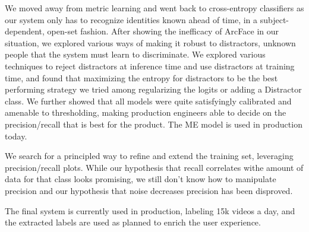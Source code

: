 We moved away from metric learning and went back to cross-entropy classifiers as our system only has to recognize identities known ahead of time, in a subject-dependent, open-set fashion. After showing the inefficacy of ArcFace in our situation, we explored various ways of making it robust to distractors, unknown people that the system must learn to discriminate. We explored various techniques to reject distractors at inference time and use distractors at training time, and found that maximizing the entropy for distractors to be the best performing strategy we tried among regularizing the logits or adding a Distractor class. We further showed that all models were quite satisfyingly calibrated and amenable to thresholding, making production engineers able to decide on the precision/recall that is best for the product. The ME model is used in production today.

We search for a principled way to refine and extend the training set, leveraging precision/recall plots. While our hypothesis that recall correlates withe amount of data for that class looks promising, we still don't know how to manipulate precision and our hypothesis that noise decreases precision has been disproved.

The final system is currently used in production, labeling 15k videos a day, and the extracted labels are used as planned to enrich the user experience.
